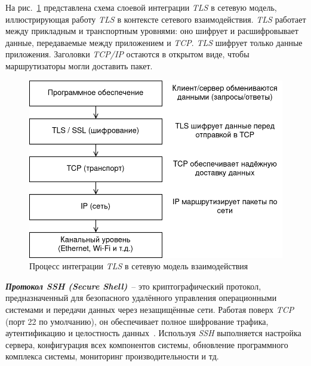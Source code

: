 На рис.~\ref{fig:system-implementation:hardware:tls-layers-integration} представлена схема слоевой интеграции \textit{TLS} в сетевую модель, иллюстрирующая работу \textit{TLS} в контексте сетевого взаимодействия. \textit{TLS} работает между прикладным и транспортным уровнями: оно шифрует и расшифровывает данные, передаваемые между приложением и \textit{TCP}. \textit{TLS} шифрует только данные приложения. Заголовки \textit{TCP/IP} остаются в открытом виде, чтобы маршрутизаторы могли доставить пакет.

\begin{figure}[h]
\centering
    \includegraphics[width=0.7\linewidth]{assets/tls-layers-integration.png}
    \caption{Процесс интеграции \textit{TLS} в сетевую модель взаимодействия}
    \label{fig:system-implementation:hardware:tls-layers-integration}
\end{figure}

\textit{\textbf{Протокол SSH (Secure Shell)}}~-- это криптографический протокол, предназначенный для безопасного удалённого управления операционными системами и передачи данных через незащищённые сети. Работая поверх \textit{TCP} (порт 22 по умолчанию), он обеспечивает полное шифрование трафика, аутентификацию и целостность данных~\cite{book_olifer_network_os}. Используя \textit{SSH} выполняется настройка сервера, конфигурация всех компонентов системы, обновление программного комплекса системы, мониторинг производительности и тд.
